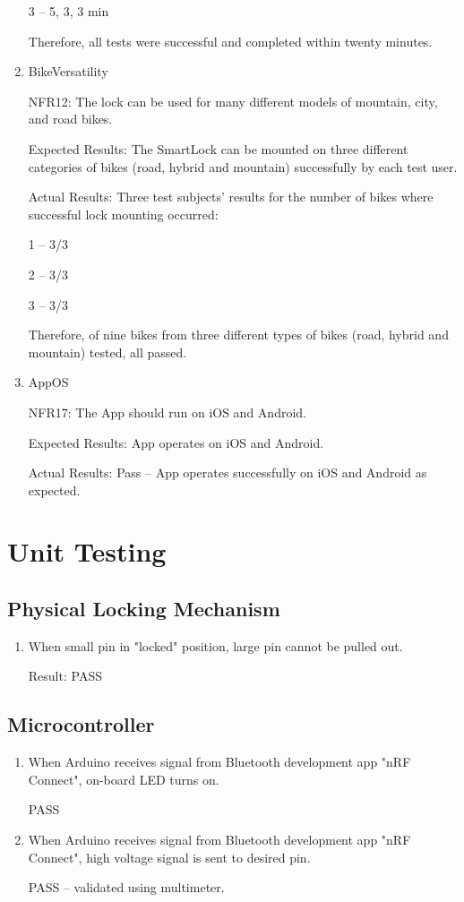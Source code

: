 \documentclass[12pt, titlepage]{article}
\begin{document}
\begin{enumerate}
3 – 5, 3, 3 min 

Therefore, all tests were successful and completed within twenty minutes. 

\item{BikeVersatility

NFR12: The lock can be used for many different models of mountain, city, and road bikes.  }

Expected Results: The SmartLock can be mounted on three different categories of bikes (road, hybrid and mountain) successfully by each test user.  

Actual Results: Three test subjects’ results for the number of bikes where successful lock mounting occurred: 

1 – 3/3 

2 – 3/3 

3 – 3/3 

Therefore, of nine bikes from three different types of bikes (road, hybrid and mountain) tested, all passed. 

\item{AppOS

NFR17: The App should run on iOS and Android.  }

Expected Results: App operates on iOS and Android. 

Actual Results: Pass -- App operates successfully on iOS and Android as expected. 

\end{enumerate}

\section{Unit Testing}

\subsection{Physical Locking Mechanism}
\begin{enumerate}
    \item When small pin in "locked" position, large pin cannot be pulled out.

    Result: PASS
\end{enumerate}

\subsection{Microcontroller}
\begin{enumerate}
    \item When Arduino receives signal from Bluetooth development app "nRF Connect", on-board LED turns on.

    PASS

    \item When Arduino receives signal from Bluetooth development app "nRF Connect", high voltage signal is sent to desired pin.

    PASS -- validated using multimeter.
\end{enumerate}
\end{document}
